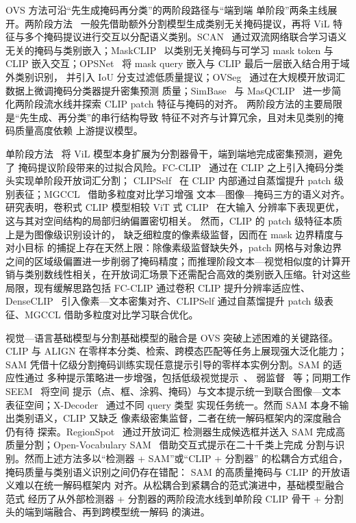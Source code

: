 OVS 方法可沿“先生成掩码再分类”的两阶段路径与“端到端 单阶段”两条主线展开。两阶段方法~\cite{liu2024open,maskclip,xu2022simple,MasQCLIP,liang2023open,chen2023open} 一般先借助额外分割模型生成类别无关掩码提议，再将 ViL 特征与多个掩码提议进行交互以分配语义类别。SCAN~\cite{liu2024open} 通过双流网络联合学习语义无关的掩码与类别嵌入；MaskCLIP~\cite{maskclip} 以类别无关掩码与可学习 mask token 与 CLIP 嵌入交互；OPSNet~\cite{chen2023open} 将 mask query 嵌入与 CLIP 最后一层嵌入结合用于域外类别识别， 并引入 IoU 分支过滤低质量提议；OVSeg~\cite{liang2023open} 通过在大规模开放词汇数据上微调掩码分类器提升密集预测 质量；SimBase~\cite{xu2022simple} 与 MasQCLIP~\cite{MasQCLIP} 进一步简化两阶段流水线并探索 CLIP patch 特征与掩码的对齐。 两阶段方法的主要局限是“先生成、再分类”的串行结构导致 特征不对齐与计算冗余，且对未见类别的掩码质量高度依赖 上游提议模型。

单阶段方法~\cite{yu2023convolutions,wu2024clipself,MGCCL} 将 ViL 模型本身扩展为分割器骨干，端到端地完成密集预测，避免了 掩码提议阶段带来的过拟合风险。FC-CLIP~\cite{yu2023convolutions} 通过在 CLIP 之上引入掩码分类头实现单阶段开放词汇分割； CLIPSelf~\cite{wu2024clipself} 在 CLIP 内部通过自蒸馏提升 patch 级别表征；MGCCL~\cite{MGCCL} 借助多粒度对比学习增强 文本—图像—掩码三方的语义对齐。研究表明，卷积式 CLIP 模型相较 ViT 式 CLIP~\cite{dosovitskiy2021image} 在大输入 分辨率下表现更优，这与其对空间结构的局部归纳偏置密切相关。 然而，CLIP 的 patch 级特征本质上是为图像级识别设计的， 缺乏细粒度的像素级监督，因而在 mask 边界精度与对小目标 的捕捉上存在天然上限：除像素级监督缺失外，patch 网格与对象边界之间的区域级偏置进一步削弱了掩码精度；而推理阶段文本—视觉相似度的计算开销与类别数线性相关，在开放词汇场景下还需配合高效的类别嵌入压缩。针对这些局限，现有缓解思路包括 FC-CLIP 通过卷积 CLIP 提升分辨率适应性、DenseCLIP~\cite{rao2022denseclip} 引入像素—文本密集对齐、CLIPSelf 通过自蒸馏提升 patch 级表征、MGCCL 借助多粒度对比学习联合优化。

视觉—语言基础模型与分割基础模型的融合是 OVS 突破上述困难的关键路径。CLIP 与 ALIGN 在零样本分类、检索、跨模态匹配等任务上展现强大泛化能力；SAM 凭借十亿级分割掩码训练实现任意提示引导的零样本实例分割。SAM 的适应性通过 多种提示策略进一步增强，包括低级视觉提示~\cite{MMRAD}、 弱监督~\cite{ROSE} 等；同期工作 SEEM~\cite{seem} 将空间 提示（点、框、涂鸦、掩码）与文本提示统一到联合图像—文本 表征空间；X-Decoder~\cite{zou2023seg} 通过不同 query 类型 实现任务统一。然而 SAM 本身不输出类别语义，CLIP 又缺乏 像素级密集监督，二者在统一解码框架内的深度融合仍有待 探索。RegionSpot~\cite{yang2024recognize} 通过开放词汇 检测器生成候选框并送入 SAM 完成高质量分割；Open-Vocabulary SAM~\cite{yuan2024open} 借助交互式提示在二十千类上完成 分割与识别。然而上述方法多以“检测器 + SAM”或“CLIP + 分割器” 的松耦合方式组合，掩码质量与类别语义识别之间仍存在错配： SAM 的高质量掩码与 CLIP 的开放语义难以在统一解码框架内 对齐。从松耦合到紧耦合的范式演进中，基础模型融合范式 经历了从外部检测器 + 分割器的两阶段流水线到单阶段 CLIP 骨干 + 分割头的端到端融合、再到跨模型统一解码 的演进。


